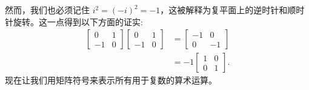 然而，我们也必须记住 $i^{2}=(-i)^{2}=-1$，这被解释为复平面上的逆时针和顺时针旋转。这一点得到以下方面的证实:
$$
  \begin{aligned}
    {\left[\begin{array}{cc}
          0  & 1 \\
          -1 & 0
        \end{array}\right]\left[\begin{array}{cc}
          0  & 1 \\
          -1 & 0
        \end{array}\right] } & =\left[\begin{array}{cc}
        -1 & 0  \\
        0  & -1
      \end{array}\right]     \\
                                                                                      & =-1\left[\begin{array}{ll}
        1 & 0 \\
        0 & 1
      \end{array}\right] .
  \end{aligned}
$$
现在让我们用矩阵符号来表示所有用于复数的算术运算。

